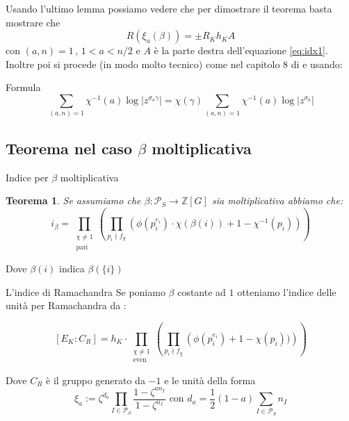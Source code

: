 \documentclass{beamer}
\theoremstyle{plain}
\newtheorem{teo}{Teorema}[section]
\theoremstyle{remark}
\theoremstyle{definition}
\newcommand{\PS}{\mathcal{P}_S}
\newcommand{\Z}{\mathbb{Z}}
\begin{document}
	\begin{frame}
		Usando l'ultimo lemma possiamo vedere che per dimostrare il teorema basta mostrare che 
		$$ R(\xi_a(\beta)) = \pm R_K h_K A $$
		con $ (a,n)=1 \, , \,1 < a <n/2 $ e $ A$ è la parte destra dell'equazione \ref{eq:idx1}.\pause \\
	
		Inoltre poi si procede (in modo molto tecnico) come nel capitolo 8 di \cite{CF} e usando:
		\begin{exampleblock}{Formula}
					\begin{equation} \label{eq:fact}
						\sum_{(a,n)=1} \chi ^{-1} (a) \log | z ^{\sigma_a \gamma }| = \chi (\gamma) \sum_{(a,n)=1} \chi ^{-1}(a) \log | z ^{\sigma_a  }|
					\end{equation}
		\end{exampleblock}
	\end{frame}

\subsection{Teorema nel caso $\beta$ moltiplicativa}	
	\begin{frame}{Indice per $\beta$ moltiplicativa}
			\begin{teo}
				\label{teo:idx_m}
				Se assumiamo che $ \beta : \PS \to \Z[G] $ sia moltiplicativa abbiamo che:
				\begin{equation}\label{eq:idx_m}
					i_\beta =  \prod_{ \substack{\chi \neq 1 \\ \text{pari}}} \left( \prod_{p_i \nmid f_\chi} \left( \phi (p_i^{e_i}) \cdot \chi (\beta (i))  + 1- \chi^{-1} (p_i)\right)  \right) 
				\end{equation}
			\end{teo}
			Dove $ \beta(i) $ indica $ \beta (\{i\})$
	\end{frame}
	
	\begin{frame}{L'indice di Ramachandra}
		Se poniamo $\beta$ costante ad $ 1 $ otteniamo l'indice delle unità per Ramachandra da \cite{RAM}:
			\begin{alertblock}{}
			\begin{equation}\label{eq:idx_ram}
				[E_K : C_R ] = h_K \cdot  \prod_{ \substack{\chi \neq 1 \\ \text{even}}} \left( \prod_{p_i \nmid f_\chi} \left( \phi (p_i^{e_i})  + 1- \chi (p_i))\right)  \right) 
			\end{equation}
			\end{alertblock}
			Dove $ C_R $ è il gruppo generato da $ -1 $ e le unità della forma
			\[ \xi_a := \zeta ^{d_a } \prod _{I \in \PS} \frac{ 1 - \zeta^{an_I}}{ 1 - \zeta^{n_I}}  \text{ con } d_a =\frac{1}{2}(1-a) \sum_{I \in \PS} n_I\]
	\end{frame}
	
\end{document}
